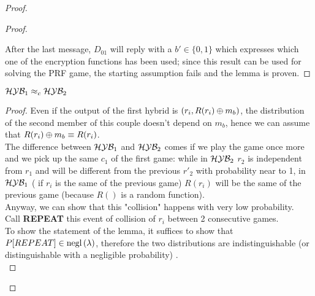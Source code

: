 \begin{proof}
\begin{proof}
\begin{figure}[h!]
\end{figure}

After the last message, $D_{01}$ will reply with a $b' \in \{0,1\}$ which
expresses which one of the encryption functions has been used; since this result
can be used for solving the PRF game, the starting assumption fails and the
lemma is proven.

\end{proof}

\begin{lemma}

    $\mathcal{H}\mathcal{Y}\mathcal{B}_{1} \approx_{c} \mathcal{H}\mathcal{Y}\mathcal{B}_{2}$
    
\end{lemma}
\begin{proof}
Even if the output of the first  hybrid is $(r_{i}, R(r_{i}) \oplus m_{b})$,
the distribution of the second member of this couple doesn't depend on $m_{b}$,
hence we can assume that $R(r_{i}) \oplus m_{b} \equiv R(r_{i})$.\\

The difference between $\mathcal{H}\mathcal{Y}\mathcal{B}_{1}$ and $\mathcal{H}\mathcal{Y}\mathcal{B}_{2}$ comes if we play the game
once more and we pick up the same $c_{1}$ of the first game: while in
$\mathcal{H}\mathcal{Y}\mathcal{B}_{2}$ $r_{2}$ is independent from $r_{1}$ and will be different from the
previous $r'_{2}$  with probability near to 1, in $\mathcal{H}\mathcal{Y}\mathcal{B}_{1}$ ( if $r_{i}$ is
the same of the previous game) 
$R(r_{i})$ will be the same of the previous game (because $R()$ is a
random function).\\

Anyway, we can show that this "collision" happens with very low probability.\\

Call \textbf{REPEAT}  this event of collision of $r_{i}$ between 2 consecutive
games.\\
To show the statement of the lemma, it suffices to show that 
$P[REPEAT] \in \mathrm{negl}\left({\lambda}\right) $, therefore the two distributions are
indistinguishable (or distinguishable with a negligible probability) .\\


\end{proof}
\end{proof}
